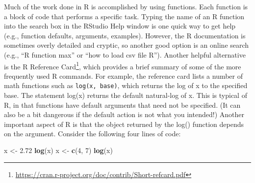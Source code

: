 \documentclass[
]{krantz}
\makeatletter
\newenvironment{Shaded}{\begin{snugshade}}{\end{snugshade}}
\newcommand{\DecValTok}[1]{\textcolor[rgb]{0.06,0.06,0.06}{#1}}
\newcommand{\FloatTok}[1]{\textcolor[rgb]{0.06,0.06,0.06}{#1}}
\newcommand{\FunctionTok}[1]{\textcolor[rgb]{0.27,0.27,0.27}{\textbf{#1}}}
\newcommand{\NormalTok}[1]{#1}
\newcommand{\OtherTok}[1]{\textcolor[rgb]{0.37,0.37,0.37}{#1}}
\renewcommand{\href}[2]{#2\footnote{\url{#1}}}
\newenvironment{kframe}{%
\medskip{}
\setlength{\fboxsep}{.8em}
 \def\at@end@of@kframe{}%
 \ifinner\ifhmode%
  \def\at@end@of@kframe{\end{minipage}}%
  \begin{minipage}{\columnwidth}%
 \fi\fi%
 \def\FrameCommand##1{\hskip\@totalleftmargin \hskip-\fboxsep
 \colorbox{shadecolor}{##1}\hskip-\fboxsep
     \hskip-\linewidth \hskip-\@totalleftmargin \hskip\columnwidth}%
 \MakeFramed {\advance\hsize-\width
   \@totalleftmargin\z@ \linewidth\hsize
   \@setminipage}}%
 {\par\unskip\endMakeFramed%
 \at@end@of@kframe}
\renewenvironment{Shaded}{\begin{kframe}}{\end{kframe}}
\makeatother
\begin{document}
Much of the work done in R is accomplished by using functions. Each function is a block of code that performs a specific task. Typing the name of an R function into the search box in the RStudio Help window is one quick way to get help (e.g., function defaults, arguments, examples). However, the R documentation is sometimes overly detailed and cryptic, so another good option is an online search (e.g., ``R function max'' or ``how to load csv file R''). Another helpful alternative is the \href{https://cran.r-project.org/doc/contrib/Short-refcard.pdf}{R Reference Card}, which provides a brief summary of some of the more frequently used R commands. For example, the reference card lists a number of math functions such as \texttt{log(x,\ base)}, which returns the log of x to the specified base. The statement log(x) returns the default natural-log of x. This is typical of R, in that functions have default arguments that need not be specified. (It can also be a bit dangerous if the default action is not what you intended!) Another important aspect of R is that the object returned by the log() function depends on the argument. Consider the following four lines of code:

\begin{Shaded}
\begin{Highlighting}[]
\NormalTok{x }\OtherTok{\textless{}{-}} \FloatTok{2.72}
\FunctionTok{log}\NormalTok{(x)}
\NormalTok{x }\OtherTok{\textless{}{-}} \FunctionTok{c}\NormalTok{(}\DecValTok{4}\NormalTok{, }\DecValTok{7}\NormalTok{)}
\FunctionTok{log}\NormalTok{(x)}
\end{Highlighting}
\end{Shaded}
\end{document}
